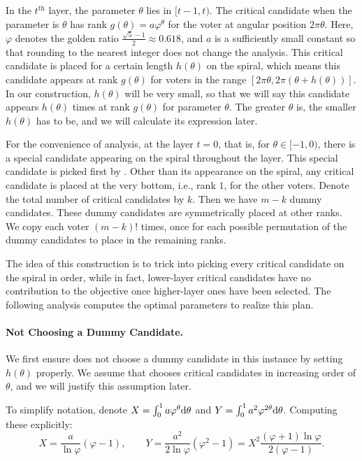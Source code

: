 In the $t^{\text{th}}$ layer, the parameter $\theta$ lies in $[t - 1, t)$. The critical candidate when the parameter is $\theta$ has rank $g(\theta) = a \varphi^{\theta}$ for the voter at angular position $2\pi\theta$. Here, $\varphi$ denotes the golden ratio $\frac{\sqrt{5} - 1}{2} \approx 0.618$, and $a$ is a sufficiently small constant so that rounding to the nearest integer does not change the analysis. This critical candidate is placed for a certain length $h(\theta)$ on the spiral, which means this candidate appears at rank $g(\theta)$ for voters in the range $\left[2\pi\theta, 2\pi(\theta + h(\theta))\right]$. In our construction, $h(\theta)$ will be very small, so that we will say this candidate appears $h(\theta)$ times at rank $g(\theta)$ for parameter $\theta$. The greater $\theta$ is, the smaller $h(\theta)$ has to be, and we will calculate its expression later. 

For the convenience of analysis, at the layer $t = 0$, that is, for $\theta \in [-1,0)$, there is a special candidate appearing on the spiral throughout the layer. This special candidate is picked first by \g{}. Other than its appearance on the spiral, any critical candidate is placed at the very bottom, i.e., rank $1$, for the other voters. Denote the total number of critical candidates by $k$. Then we have $m - k$ dummy candidates. These dummy candidates are symmetrically placed at other ranks. We copy each voter $(m - k)!$ times, once for each possible permutation of the dummy candidates to place in the remaining ranks. %

The idea of this construction is to trick \g{} into picking every critical candidate on the spiral in order, while in fact, lower-layer critical candidates have no contribution to the objective once higher-layer ones have been selected. The following analysis computes the optimal parameters to realize this plan.




\paragraph{Not Choosing a Dummy Candidate.} We first ensure \g{} does not choose a dummy candidate in this instance by setting $h(\theta)$ properly. We assume that \g{} chooses critical candidates in increasing order of $\theta$, and we will justify this assumption later.


To simplify notation, denote $X = \int_{0}^1 a\varphi^{\theta}\mathrm{d} \theta$ and $Y = \int_{0}^1 a^2\varphi^{2\theta}\mathrm{d} \theta$. Computing these explicitly:
\[
X = \frac{a}{\ln\varphi}(\varphi - 1), \qquad Y = \frac{a^2}{2\ln\varphi}(\varphi^2 - 1) = X^2 \frac{(\varphi + 1)\ln\varphi}{2(\varphi - 1)}.
\]

